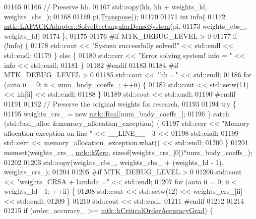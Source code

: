 \begin{DoxyCode}
{{01165 
01166   \textcolor{comment}{// Preserve hh.}
01167   std::copy(hh, hh + weights\_ld, weights\_cbs\_);
01168 
01169   pi.\hyperlink{classmtk_1_1DenseMatrix_a71d9c07ca66e88d97d1fd5012f43138b}{Transpose}();
01170 
01171   \textcolor{keywordtype}{int} info\{
01172     \hyperlink{classmtk_1_1LAPACKAdapter_a380f148ffdf96bae2f79ae28f1a6560c}{mtk::LAPACKAdapter::SolveRectangularDenseSystem}(pi,
01173                                                     weights\_cbs\_, weights\_ld)
01174   \};
01175 
01176 \textcolor{preprocessor}{  #if MTK\_DEBUG\_LEVEL > 0}
01177   \textcolor{keywordflow}{if} (!info) \{
01178     std::cout << \textcolor{stringliteral}{"System successfully solved!"} << std::endl << std::endl;
01179   \} \textcolor{keywordflow}{else} \{
01180     std::cerr << \textcolor{stringliteral}{"Error solving system! info = "} << info << std::endl;
01181   \}
01182 \textcolor{preprocessor}{  #endif}
01183 
01184 \textcolor{preprocessor}{  #if MTK\_DEBUG\_LEVEL > 0}
01185   std::cout << \textcolor{stringliteral}{"hh ="} << std::endl;
01186   \textcolor{keywordflow}{for} (\textcolor{keyword}{auto} ii = 0; ii < num\_bndy\_coeffs\_; ++ii) \{
01187     std::cout << std::setw(11) << hh[ii] << std::endl;
01188   \}
01189   std::cout << std::endl;
01190 \textcolor{preprocessor}{  #endif}
01191 
01192   \textcolor{comment}{// Preserve the original weights for research.}
01193 
01194   \textcolor{keywordflow}{try} \{
01195     weights\_crs\_ = \textcolor{keyword}{new} \hyperlink{group__c01-roots_gac080bbbf5cbb5502c9f00405f894857d}{mtk::Real}[num\_bndy\_coeffs\_];
01196   \} \textcolor{keywordflow}{catch} (std::bad\_alloc &memory\_allocation\_exception) \{
01197     std::cerr << \textcolor{stringliteral}{"Memory allocation exception on line "} << \_\_LINE\_\_ - 3 <<
01198       std::endl;
01199     std::cerr << memory\_allocation\_exception.what() << std::endl;
01200   \}
01201   memset(weights\_crs\_, \hyperlink{group__c01-roots_ga59a451a5fae30d59649bcda274fea271}{mtk::kZero}, \textcolor{keyword}{sizeof}(weights\_crs\_[0])*num\_bndy\_coeffs\_);
01202 
01203   std::copy(weights\_cbs\_, weights\_cbs\_ + (weights\_ld - 1), weights\_crs\_);
01204 
01205 \textcolor{preprocessor}{  #if MTK\_DEBUG\_LEVEL > 0}
01206   std::cout << \textcolor{stringliteral}{"weights\_CRSA + lambda ="} << std::endl;
01207   \textcolor{keywordflow}{for} (\textcolor{keyword}{auto} ii = 0; ii < weights\_ld - 1; ++ii) \{
01208     std::cout << std::setw(12) << weights\_crs\_[ii] << std::endl;
01209   \}
01210   std::cout << std::endl;
01211 \textcolor{preprocessor}{  #endif}
01212 
01214 
01215   \textcolor{keywordflow}{if} (order\_accuracy\_ >= \hyperlink{group__c01-roots_ga295dd2f403c775ecd942c22b5a777496}{mtk::kCriticalOrderAccuracyGrad}) \{
}}
\end{DoxyCode}
